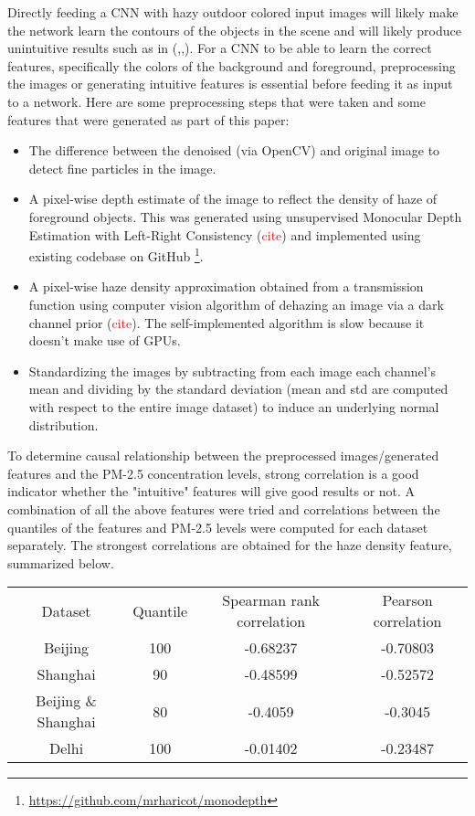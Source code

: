 \documentclass{article}
\begin{document}
Directly feeding a CNN with hazy outdoor colored input images will likely make the network learn the contours of the objects in the scene and will likely produce unintuitive results such as in (\cite{PPconv},\cite{EAPconv},\cite{IBAQconv}). For a CNN to be able to learn the correct features, specifically the colors of the background and foreground, preprocessing the images or generating intuitive features is essential before feeding it as input to a network. Here are some preprocessing steps that were taken and some features that were generated as part of this paper:
\begin{itemize}
    \item The difference between the denoised (via OpenCV) and original image to detect fine particles in the image.
    \item A pixel-wise depth estimate of the image to reflect the density of haze of foreground objects. This was generated using unsupervised Monocular Depth Estimation with Left-Right Consistency (\textcolor{red}{cite}) and implemented using existing codebase on GitHub \footnote{\url{https://github.com/mrharicot/monodepth}}.
    \item A pixel-wise haze density approximation obtained from a transmission function using computer vision algorithm of dehazing an image via a dark channel prior (\textcolor{red}{cite}). The self-implemented algorithm is slow because it doesn't make use of GPUs. 
    \item Standardizing the images by subtracting from each image each channel's mean and dividing by the standard deviation (mean and std are computed with respect to the entire image dataset) to induce an underlying normal distribution.
\end{itemize}
To determine causal relationship between the preprocessed images/generated features and the PM-2.5 concentration levels, strong correlation is a good indicator whether the "intuitive" features will give good results or not. A combination of all the above features were tried and correlations between the quantiles of the features and PM-2.5 levels were computed for each dataset separately. The strongest correlations are obtained for the haze density feature, summarized below.
\begin{center}
\begin{tabular}{ c c c c }
 Dataset & Quantile & Spearman rank correlation & Pearson correlation \\ 
 Beijing & 100 & -0.68237 & -0.70803\\  
 Shanghai & 90 & -0.48599  & -0.52572\\
 Beijing \& Shanghai & 80 & -0.4059  & -0.3045\\
 Delhi & 100 & -0.01402  & -0.23487\\
\end{tabular}
\end{center}
\end{document}
